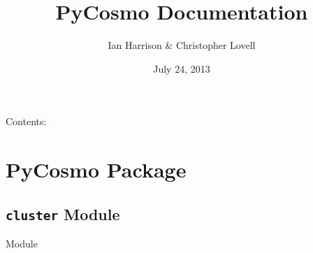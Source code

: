 \documentclass[letterpaper,10pt,english]{sphinxmanual}
\title{PyCosmo Documentation}
\date{July 24, 2013}
\author{Ian Harrison \& Christopher Lovell}
\begin{document}
\maketitle
\tableofcontents
{}\label{index::doc}


Contents:


\chapter{PyCosmo Package}
\label{PyCosmo::doc}\label{PyCosmo:pycosmo-package}\label{PyCosmo:welcome-to-pycosmo-s-documentation}

\section{\texttt{cluster} Module}
\label{PyCosmo:cluster-module}\label{PyCosmo:module-PyCosmo.cluster}
 Module

\begin{fulllineitems}
\label{PyCosmo:PyCosmo.cluster.clust}~

\begin{fulllineitems}
\label{PyCosmo:PyCosmo.cluster.clust.display}
\end{fulllineitems}


\begin{fulllineitems}
\label{PyCosmo:PyCosmo.cluster.clust.info}
\end{fulllineitems}


\begin{fulllineitems}
\label{PyCosmo:PyCosmo.cluster.clust.make_ymap}
\end{fulllineitems}


\begin{fulllineitems}
\label{PyCosmo:PyCosmo.cluster.clust.trim}
\end{fulllineitems}


\begin{fulllineitems}
\label{PyCosmo:PyCosmo.cluster.clust.y}
\end{fulllineitems}


\end{fulllineitems}
\end{document}
